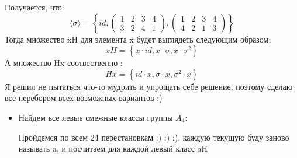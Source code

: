 \documentclass[a4paper,12pt]{article}
\begin{document}
Получается, что: \[\langle \sigma \rangle = \left\{ id, \begin{pmatrix}
1 & 2 & 3 &4 \\ 3 & 2 & 4 & 1 
\end{pmatrix},  \begin{pmatrix}
1 & 2 & 3 & 4 \\ 4 & 2 & 1 & 3
\end{pmatrix}\right\}\]
Тогда множество xH для элемента x будет выглядеть следующим образом:
\[
xH = \left\{x \cdot id, x \cdot \sigma, x  \cdot \sigma^2\right\}
\]
А множество Hx соотвественно :
\[
Hx= \left\{id \cdot x , \sigma \cdot  x , \sigma^2 \cdot x \right\}
\]
Я решил не пытаться что-то мудрить и упрощать себе решение, поэтому сделаю все перебором всех возможных вариантов :)
\clearpage
\begin{itemize}
\item 
Найдем все левые смежные классы группы $A_4$:

\quad Пройдемся по всем 24 перестановкам :) :) :), каждую текущую буду заново называть a,  и посчитаем для каждой левый класс aH


\end{itemize}
\end{document}
